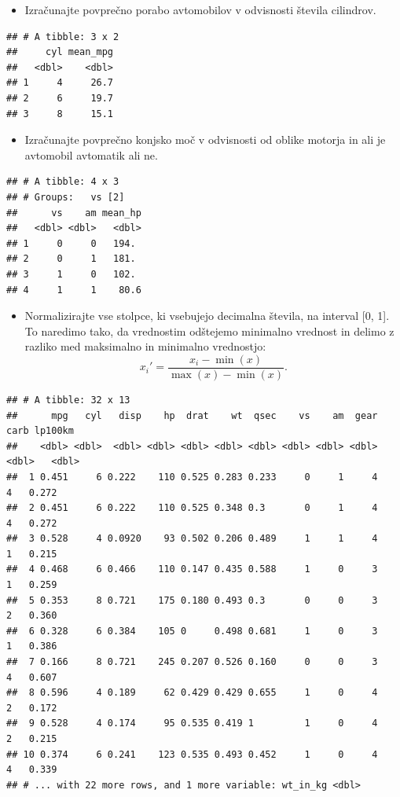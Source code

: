 \documentclass[
]{book}
\providecommand{\tightlist}{%
  \setlength{\itemsep}{0pt}\setlength{\parskip}{0pt}}
\begin{document}
\begin{enumerate}
  \begin{itemize}
  \tightlist
  \item
    Izračunajte povprečno porabo avtomobilov v odvisnosti števila cilindrov.
  \end{itemize}

\begin{verbatim}
## # A tibble: 3 x 2
##     cyl mean_mpg
##   <dbl>    <dbl>
## 1     4     26.7
## 2     6     19.7
## 3     8     15.1
\end{verbatim}

  \begin{itemize}
  \tightlist
  \item
    Izračunajte povprečno konjsko moč v odvisnosti od oblike motorja in ali je avtomobil avtomatik ali ne.
  \end{itemize}

\begin{verbatim}
## # A tibble: 4 x 3
## # Groups:   vs [2]
##      vs    am mean_hp
##   <dbl> <dbl>   <dbl>
## 1     0     0   194. 
## 2     0     1   181. 
## 3     1     0   102. 
## 4     1     1    80.6
\end{verbatim}

  \begin{itemize}
  \tightlist
  \item
    Normalizirajte vse stolpce, ki vsebujejo decimalna števila, na interval {[}0, 1{]}. To naredimo tako, da vrednostim odštejemo minimalno vrednost in delimo z razliko med maksimalno in minimalno vrednostjo:
    \[
     x_i' = \frac{x_i - \min(x)}{\max(x) - \min(x)}.
     \]
  \end{itemize}

\begin{verbatim}
## # A tibble: 32 x 13
##      mpg   cyl   disp    hp  drat    wt  qsec    vs    am  gear  carb lp100km
##    <dbl> <dbl>  <dbl> <dbl> <dbl> <dbl> <dbl> <dbl> <dbl> <dbl> <dbl>   <dbl>
##  1 0.451     6 0.222    110 0.525 0.283 0.233     0     1     4     4   0.272
##  2 0.451     6 0.222    110 0.525 0.348 0.3       0     1     4     4   0.272
##  3 0.528     4 0.0920    93 0.502 0.206 0.489     1     1     4     1   0.215
##  4 0.468     6 0.466    110 0.147 0.435 0.588     1     0     3     1   0.259
##  5 0.353     8 0.721    175 0.180 0.493 0.3       0     0     3     2   0.360
##  6 0.328     6 0.384    105 0     0.498 0.681     1     0     3     1   0.386
##  7 0.166     8 0.721    245 0.207 0.526 0.160     0     0     3     4   0.607
##  8 0.596     4 0.189     62 0.429 0.429 0.655     1     0     4     2   0.172
##  9 0.528     4 0.174     95 0.535 0.419 1         1     0     4     2   0.215
## 10 0.374     6 0.241    123 0.535 0.493 0.452     1     0     4     4   0.339
## # ... with 22 more rows, and 1 more variable: wt_in_kg <dbl>
\end{verbatim}


\end{enumerate}
\end{document}
